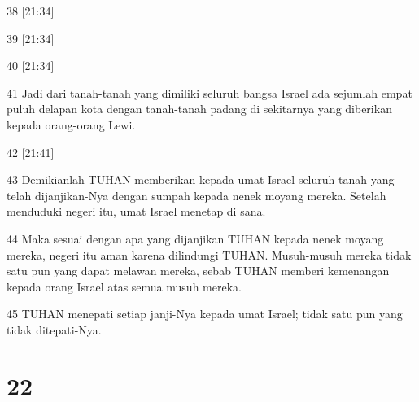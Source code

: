 \par 38 [21:34]
\par 39 [21:34]
\par 40 [21:34]
\par 41 Jadi dari tanah-tanah yang dimiliki seluruh bangsa Israel ada sejumlah empat puluh delapan kota dengan tanah-tanah padang di sekitarnya yang diberikan kepada orang-orang Lewi.
\par 42 [21:41]
\par 43 Demikianlah TUHAN memberikan kepada umat Israel seluruh tanah yang telah dijanjikan-Nya dengan sumpah kepada nenek moyang mereka. Setelah menduduki negeri itu, umat Israel menetap di sana.
\par 44 Maka sesuai dengan apa yang dijanjikan TUHAN kepada nenek moyang mereka, negeri itu aman karena dilindungi TUHAN. Musuh-musuh mereka tidak satu pun yang dapat melawan mereka, sebab TUHAN memberi kemenangan kepada orang Israel atas semua musuh mereka.
\par 45 TUHAN menepati setiap janji-Nya kepada umat Israel; tidak satu pun yang tidak ditepati-Nya.

\chapter{22}

